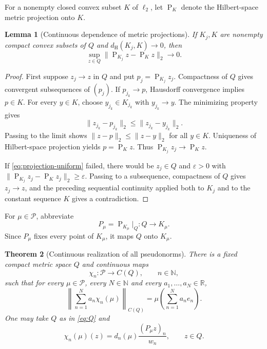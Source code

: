 \documentclass[11pt]{article}
\newtheorem{theorem}{Theorem}[section]
\newtheorem{lemma}[theorem]{Lemma}
\theoremstyle{definition}
\newcommand{\Pcal}{\mathcal P}
\newcommand{\N}{\mathbb N}
\newcommand{\R}{\mathbb R}
\newcommand{\ellTwo}{\ell_2}
\newcommand{\Haus}{d_{\mathrm H}}
\newcommand{\Proj}{\operatorname{P}}
\newcommand{\eps}{\varepsilon}
\begin{document}
For a nonempty closed convex subset $K$ of $\ellTwo$, let $\Proj_K$ denote the
Hilbert-space metric projection onto $K$.

\begin{lemma}[Continuous dependence of metric projections]
\label{lem:projection}
If $K_j,K$ are nonempty compact convex subsets of $Q$ and
$\Haus(K_j,K)\to0$, then
\[
 \sup_{z\in Q}\|\Proj_{K_j}z-\Proj_Kz\|_2\longrightarrow0.
 \tag{5.1}\label{eq:projection-uniform}
\]
\end{lemma}

\begin{proof}
First suppose $z_j\to z$ in $Q$ and put $p_j=\Proj_{K_j}z_j$.  Compactness of
$Q$ gives convergent subsequences of $(p_j)$.  If $p_{j_k}\to p$, Hausdorff
convergence implies $p\in K$.  For every $y\in K$, choose $y_{j_k}\in K_{j_k}$
with $y_{j_k}\to y$.  The minimizing property gives
\[
 \|z_{j_k}-p_{j_k}\|_2\leq\|z_{j_k}-y_{j_k}\|_2.
\]
Passing to the limit shows $\|z-p\|_2\leq\|z-y\|_2$ for all $y\in K$.
Uniqueness of Hilbert-space projection yields $p=\Proj_Kz$.  Thus
$\Proj_{K_j}z_j\to\Proj_Kz$.

If \eqref{eq:projection-uniform} failed, there would be $z_j\in Q$ and
$\eps>0$ with
$\|\Proj_{K_j}z_j-\Proj_Kz_j\|_2\geq\eps$.  Passing to a subsequence, compactness
of $Q$ gives $z_j\to z$, and the preceding sequential continuity applied both
to $K_j$ and to the constant sequence $K$ gives a contradiction.
\end{proof}

For $\mu\in\Pcal$, abbreviate
\[
 P_\mu=\Proj_{K_\mu}|_Q:Q\longrightarrow K_\mu.
\]
Since $P_\mu$ fixes every point of $K_\mu$, it maps $Q$ onto $K_\mu$.

\begin{theorem}[Continuous realization of all pseudonorms]
\label{thm:realization}
There is a fixed compact metric space $Q$ and continuous maps
\[
 \chi_n:\Pcal\longrightarrow C(Q),\qquad n\in\N,
\]
such that for every $\mu\in\Pcal$, every $N\in\N$ and every
$a_1,\ldots,a_N\in\R$,
\[
 \left\|\sum_{n=1}^N a_n\chi_n(\mu)\right\|_{C(Q)}
 =\mu\left(\sum_{n=1}^N a_ne_n\right).
 \tag{5.2}\label{eq:main-identity}
\]
One may take $Q$ as in \eqref{eq:Q} and
\[
 \chi_n(\mu)(z)
 =d_n(\mu)\frac{(P_\mu z)_n}{w_n},
 \qquad z\in Q.
 \tag{5.3}\label{eq:chi}
\]
\end{theorem}
\end{document}
